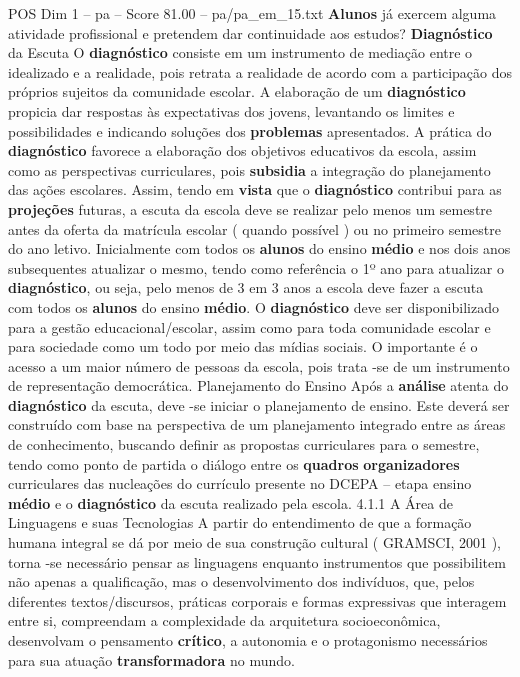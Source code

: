 \begin{textsample}{POS Dim 1 – pa – Score 81.00 – pa/pa\_em\_15.txt}  \label{ex:f1_pos_032}
\textbf{Alunos} já exercem alguma atividade profissional e pretendem dar continuidade aos estudos? \textbf{Diagnóstico} da Escuta O \textbf{diagnóstico} consiste em um instrumento de mediação entre o idealizado e a realidade, pois retrata a realidade de acordo com a participação dos próprios sujeitos da comunidade escolar.
A elaboração de um \textbf{diagnóstico} propicia dar respostas às expectativas dos jovens, levantando os limites e possibilidades e indicando soluções dos \textbf{problemas} apresentados.
A prática do \textbf{diagnóstico} favorece a elaboração dos objetivos educativos da escola, assim como as perspectivas curriculares, pois \textbf{subsidia} a integração do planejamento das ações escolares.
Assim, tendo em \textbf{vista} que o \textbf{diagnóstico} contribui para as \textbf{projeções} futuras, a escuta da escola deve se realizar pelo menos um semestre antes da oferta da matrícula escolar ( quando possível ) ou no primeiro semestre do ano letivo.
Inicialmente com todos os \textbf{alunos} do ensino \textbf{médio} e nos dois anos subsequentes atualizar o mesmo, tendo como referência o 1º ano para atualizar o \textbf{diagnóstico}, ou seja, pelo menos de 3 em 3 anos a escola deve fazer a escuta com todos os \textbf{alunos} do ensino \textbf{médio}.
O \textbf{diagnóstico} deve ser disponibilizado para a gestão educacional/escolar, assim como para toda comunidade escolar e para sociedade como um todo por meio das mídias sociais.
O importante é o acesso a um maior número de pessoas da escola, pois trata -se de um instrumento de representação democrática.
Planejamento do Ensino Após a \textbf{análise} atenta do \textbf{diagnóstico} da escuta, deve -se iniciar o planejamento de ensino.
Este deverá ser construído com base na perspectiva de um planejamento integrado entre as áreas de conhecimento, buscando definir as propostas curriculares para o semestre, tendo como ponto de partida o diálogo entre os \textbf{quadros} \textbf{organizadores} curriculares das nucleações do currículo presente no DCEPA – etapa ensino \textbf{médio} e o \textbf{diagnóstico} da escuta realizado pela escola. 4.1.1 A Área de Linguagens e suas Tecnologias A partir do entendimento de que a formação humana integral se dá por meio de sua construção cultural ( GRAMSCI, 2001 ), torna -se necessário pensar as linguagens enquanto instrumentos que possibilitem não apenas a qualificação, mas o desenvolvimento dos indivíduos, que, pelos diferentes textos/discursos, práticas corporais e formas expressivas que interagem entre si, compreendam a complexidade da arquitetura socioeconômica, desenvolvam o pensamento \textbf{crítico}, a autonomia e o protagonismo necessários para sua atuação \textbf{transformadora} no mundo.

\end{textsample}
